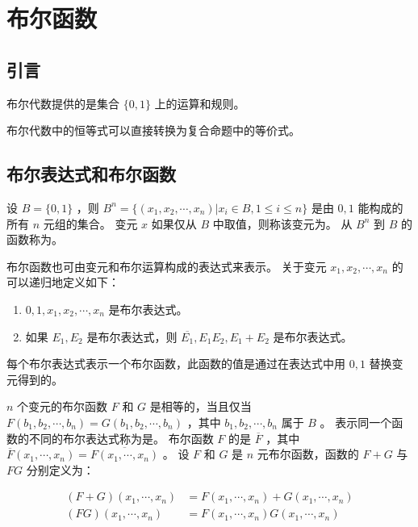 
\section{布尔函数}
{
    \subsection{引言}
    {
        布尔代数提供的是集合 $\{0, 1\}$ 上的运算和规则。

        布尔代数中的恒等式可以直接转换为复合命题中的等价式。
    }

    \subsection{布尔表达式和布尔函数}
    {
        设 $B = \{0, 1\}$ ，则 $B^n = \{(x_1, x_2, \cdots, x_n) | x_i \in B, 1 \leq i \leq n\}$ 是由 $0, 1$ 能构成的所有 $n$ 元组的集合。
        变元 $x$ 如果仅从 $B$ 中取值，则称该变元为。
        从 $B^n$ 到 $B$ 的函数称为。

        布尔函数也可由变元和布尔运算构成的表达式来表示。
        关于变元 $x_1, x_2, \cdots, x_n$ 的可以递归地定义如下：

        \begin{enumerate}
            \item $0, 1, x_1, x_2, \cdots, x_n$ 是布尔表达式。
            \item 如果 $E_1, E_2$ 是布尔表达式，则 $\overline{E_1}, E_1E_2, E_1 + E_2$ 是布尔表达式。
        \end{enumerate}

        每个布尔表达式表示一个布尔函数，此函数的值是通过在表达式中用 $0, 1$ 替换变元得到的。

        $n$ 个变元的布尔函数 $F$ 和 $G$ 是相等的，当且仅当 $F(b_1, b_2, \cdots, b_n) = G(b_1, b_2, \cdots, b_n)$ ，其中 $b_1, b_2, \cdots, b_n$ 属于 $B$ 。
        表示同一个函数的不同的布尔表达式称为是。
        布尔函数 $F$ 的是 $\overline{F}$ ，其中 $\overline{F}(x_1, \cdots, x_n) = \overline{F(x_1, \cdots, x_n)}$ 。
        设 $F$ 和 $G$ 是 $n$ 元布尔函数，函数的 $F + G$ 与 $FG$ 分别定义为：
        
        \begin{align*}
            (F + G)(x_1, \cdots, x_n) &= F(x_1, \cdots, x_n) + G(x_1, \cdots, x_n) \\
            (FG)(x_1, \cdots, x_n) &= F(x_1, \cdots, x_n)G(x_1, \cdots, x_n)
        \end{align*}

}}
